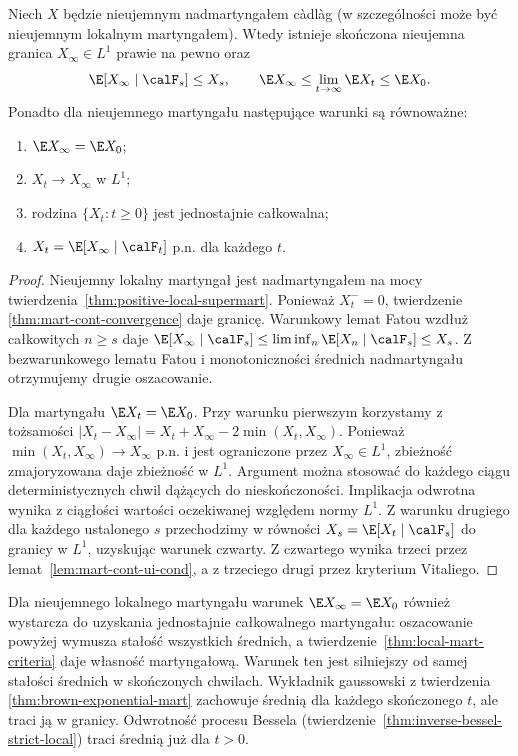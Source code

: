 \begin{twierdzenie}
\label{thm:nonnegative-mart-convergence}
Niech $X$ będzie nieujemnym nadmartyngałem
c\`adl\`ag (w szczególności może być nieujemnym
lokalnym martyngałem).
Wtedy istnieje skończona nieujemna granica
$X_\infty\in L^1$ prawie na pewno oraz
\[
\E[X_\infty\mid\calF_s]\le X_s,\qquad
\E X_\infty\le\lim_{t\to\infty}\E X_t\le\E X_0.
\]
Ponadto dla nieujemnego martyngału
następujące warunki są równoważne:
\begin{enumerate}
\item $\E X_\infty=\E X_0$;
\item $X_t\to X_\infty$ w $L^1$;
\item rodzina $\{X_t:t\ge0\}$ jest jednostajnie całkowalna;
\item $X_t=\E[X_\infty\mid\calF_t]$ p.n. dla każdego $t$.
\end{enumerate}
\end{twierdzenie}
\begin{proof}
Nieujemny lokalny martyngał jest nadmartyngałem
na mocy twierdzenia~\ref{thm:positive-local-supermart}.
Ponieważ $X_t^-=0$, twierdzenie
\ref{thm:mart-cont-convergence} daje granicę.
Warunkowy lemat Fatou wzdłuż całkowitych
$n\ge s$ daje
$\E[X_\infty\mid\calF_s]\le
\liminf_n\E[X_n\mid\calF_s]\le X_s$.
Z bezwarunkowego lematu Fatou i monotoniczności
średnich nadmartyngału otrzymujemy drugie
oszacowanie.

Dla martyngału $\E X_t=\E X_0$.
Przy warunku pierwszym korzystamy z tożsamości
$|X_t-X_\infty|=X_t+X_\infty-2\min(X_t,X_\infty)$.
Ponieważ $\min(X_t,X_\infty)\to X_\infty$
p.n. i jest ograniczone przez $X_\infty\in L^1$,
zbieżność zmajoryzowana daje zbieżność w $L^1$.
Argument można stosować do każdego ciągu
deterministycznych chwil dążących do nieskończoności.
Implikacja odwrotna wynika z ciągłości wartości
oczekiwanej względem normy $L^1$.
Z warunku drugiego dla każdego ustalonego $s$
przechodzimy w równości
$X_s=\E[X_t\mid\calF_s]$ do granicy w $L^1$,
uzyskując warunek czwarty. Z czwartego
wynika trzeci przez lemat~\ref{lem:mart-cont-ui-cond},
a z trzeciego drugi przez kryterium Vitaliego.
\end{proof}

\begin{uwaga}
Dla nieujemnego lokalnego martyngału warunek
$\E X_\infty=\E X_0$ również wystarcza do
uzyskania jednostajnie całkowalnego martyngału:
oszacowanie powyżej wymusza stałość wszystkich
średnich, a twierdzenie~\ref{thm:local-mart-criteria}
daje własność martyngałową.
Warunek ten jest silniejszy od samej stałości
średnich w skończonych chwilach.
Wykładnik gaussowski z twierdzenia
\ref{thm:brown-exponential-mart}
zachowuje średnią dla każdego skończonego $t$,
ale traci ją w granicy. Odwrotność procesu Bessela
(twierdzenie~\ref{thm:inverse-bessel-strict-local})
traci średnią już dla $t>0$.
\end{uwaga}

